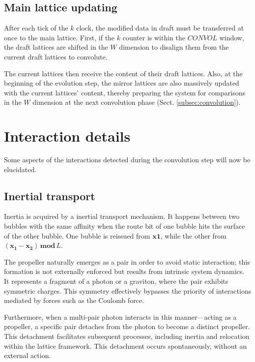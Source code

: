 \documentclass[12pt,english]{article}
\begin{document}
\subsection{Main lattice updating} \label{subsec:updating}
After each tick of the $k$ clock, the modified data in draft must be transferred at once to the main lattice. First, if the $k$ counter is within the $CONVOL$ window, the draft lattices are shifted in the $W$ dimension to disalign them from the current draft lattices to convolute.

The current lattices then receive the content of their draft lattices. Also, at the beginning of the evolution step, the mirror lattices are also massively updated with the current lattices' content, thereby preparing the system for comparisons in the $W$ dimension at the next convolution phase (Sect. \ref{subsec:convolution}).


\section{Interaction details\label{sec:Interactions}}

Some aspects of the interactions detected during the convolution step will now be elucidated.

\subsection{Inertial transport} \label{subsec:inertial-transport}

Inertia is acquired by a inertial transport mechanism. It happens between two bubbles with the same affinity when the route bit of one bubble hits the surface of the other bubble. One bubble is reissued from $\boldsymbol{x1}$, while the other from $(\boldsymbol{x_1}-\boldsymbol{x_2})\,\boldsymbol{mod}\,L$.

The propeller naturally emerges as a pair in order to avoid static interaction; this formation is not externally enforced but results from intrinsic system dynamics. It represents a fragment of a photon or a graviton, where the pair exhibits symmetric charges. This symmetry effectively bypasses the priority of interactions mediated by forces such as the Coulomb force. 

Furthermore, when a multi-pair photon interacts in this manner—acting as a propeller, a specific pair detaches from the photon to become a distinct propeller. This detachment facilitates subsequent processes, including inertia and relocation within the lattice framework. This detachment occurs spontaneously, without an external action.
\end{document}
